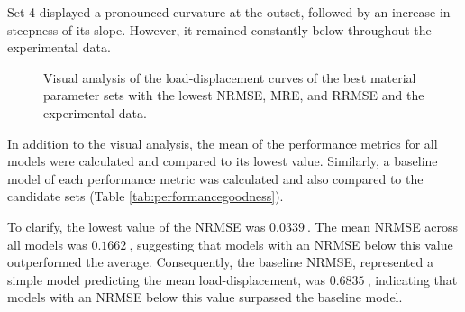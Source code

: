 Set \SI{4}{} displayed a pronounced curvature at the outset, followed by an increase in steepness of its slope.
However, it remained constantly below throughout the experimental data.\\

\begin{figure}%
    \centering
   \quad
   \caption[Best material parameter sets load-displacement curves]{Visual analysis of the load-displacement curves of the best material parameter sets with the lowest NRMSE, MRE, and RRMSE and the experimental data.}%
   \label{fig:bestfitcandidatescurve}%
\end{figure}

In addition to the visual analysis, the mean of the performance metrics for all models were calculated and 
compared to its lowest value. Similarly, a baseline model of each performance metric was calculated and 
also compared to the candidate sets (Table \ref{tab:performancegoodness}). 

To clarify, the lowest value of the NRMSE was $\SI{0.0339}{}$. The mean NRMSE across all models was 
$\SI{0.1662}{}$, suggesting that models with an NRMSE below this value outperformed the average.
Consequently, the baseline NRMSE, represented a simple model predicting the mean load-displacement, was 
$\SI{0.6835}{}$, indicating that models with an NRMSE below this value surpassed the baseline model.\\ 

